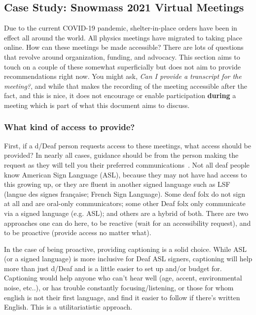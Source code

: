 \documentclass{article}
\begin{document}
  \subsection{Case Study: Snowmass 2021 Virtual Meetings}

  Due to the current COVID-19 pandemic, shelter-in-place orders have been in effect all around the world. All physics meetings have migrated to taking place online. How can these meetings be made accessible? There are lots of questions that revolve around organization, funding, and advocacy. This section aims to touch on a couple of these somewhat superficially but does not aim to provide recommendations right now. You might ask, \textsl{Can I provide a transcript for the meeting?}, and while that makes the recording of the meeting accessible after the fact, and this is nice, it does not encourage or enable participation \textbf{during} a meeting which is part of what this document aims to discuss.

  \subsubsection{What kind of access to provide?}

  First, if a d/Deaf person requests access to these meetings, what access should be provided? In nearly all cases, guidance should be from the person making the request as they will tell you their preferred communications~\cite{chua2017behind}. Not all deaf people know American Sign Language (ASL), because they may not have had access to this growing up, or they are fluent in another signed language such as LSF (langue des signes française; French Sign Language). Some deaf folx do not sign at all and are oral-only communicators; some other Deaf folx only communicate via a signed language (e.g. ASL); and others are a hybrid of both. There are two approaches one can do here, to be reactive (wait for an accessibility request), and to be proactive (provide access no matter what).

  In the case of being proactive, providing captioning is a solid choice. While ASL (or a signed language) is more inclusive for Deaf ASL signers, captioning will help more than just d/Deaf and is a little easier to set up and/or budget for. Captioning would help anyone who can't hear well (age, accent, environmental noise, etc..), or has trouble constantly focusing/listening, or those for whom english is not their first language, and find it easier to follow if there's written English. This is a utilitariatistic approach.
\end{document}
